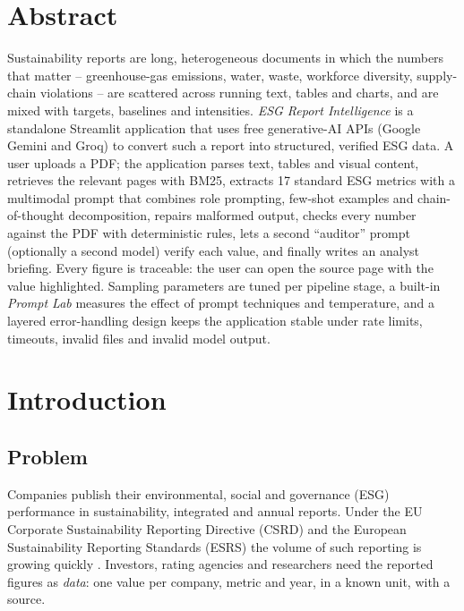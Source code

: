 \documentclass[11pt,a4paper]{article}
\begin{document}
\section*{Abstract}
Sustainability reports are long, heterogeneous documents in which the numbers that matter --
greenhouse-gas emissions, water, waste, workforce diversity, supply-chain violations -- are scattered
across running text, tables and charts, and are mixed with targets, baselines and intensities.
\emph{ESG Report Intelligence} is a standalone Streamlit application that uses free generative-AI APIs
(Google Gemini and Groq) to convert such a report into structured, verified ESG data. A user uploads a
PDF; the application parses text, tables and visual content, retrieves the relevant pages with BM25,
extracts 17 standard ESG metrics with a multimodal prompt that combines role prompting, few-shot
examples and chain-of-thought decomposition, repairs malformed output, checks every number against the
PDF with deterministic rules, lets a second ``auditor'' prompt (optionally a second model) verify each
value, and finally writes an analyst briefing. Every figure is traceable: the user can open the source
page with the value highlighted. Sampling parameters are tuned per pipeline stage, a built-in
\emph{Prompt Lab} measures the effect of prompt techniques and temperature, and a layered error-handling
design keeps the application stable under rate limits, timeouts, invalid files and invalid model output.

\tableofcontents
\newpage

\section{Introduction}
\subsection{Problem}
Companies publish their environmental, social and governance (ESG) performance in sustainability,
integrated and annual reports. Under the EU Corporate Sustainability Reporting Directive (CSRD) and the
European Sustainability Reporting Standards (ESRS) the volume of such reporting is growing quickly
\cite{csrd,esrs}. Investors, rating agencies and researchers need the reported figures as
\emph{data}: one value per company, metric and year, in a known unit, with a source.
\end{document}

